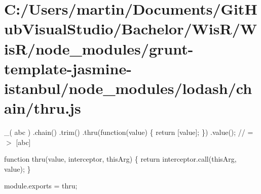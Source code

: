 \hypertarget{_c_1_2_users_2martin_2_documents_2_git_hub_visual_studio_2_bachelor_2_wis_r_2_wis_r_2node_module4090764a1679b801906234dd3be71827}{}\section{C\+:/\+Users/martin/\+Documents/\+Git\+Hub\+Visual\+Studio/\+Bachelor/\+Wis\+R/\+Wis\+R/node\+\_\+modules/grunt-\/template-\/jasmine-\/istanbul/node\+\_\+modules/lodash/chain/thru.\+js}
\+\_\+(\textquotesingle{} abc \textquotesingle{}) .chain() .trim() .thru(function(value) \{ return \mbox{[}value\mbox{]}; \}) .value(); // =$>$ \mbox{[}\textquotesingle{}abc\textquotesingle{}\mbox{]}


\begin{DoxyCodeInclude}

\textcolor{keyword}{function} thru(value, interceptor, thisArg) \{
  \textcolor{keywordflow}{return} interceptor.call(thisArg, value);
\}

module.exports = thru;
\end{DoxyCodeInclude}
 